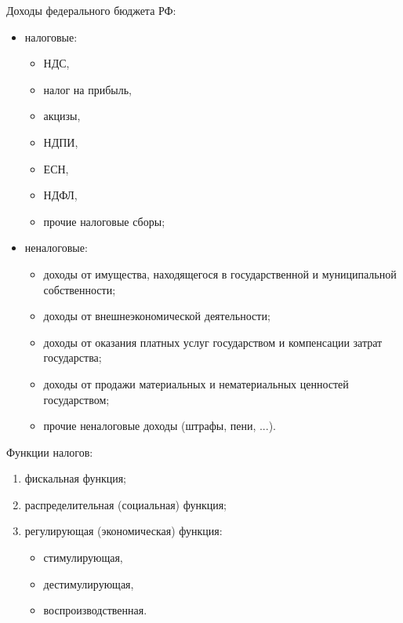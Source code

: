Доходы федерального бюджета РФ:
\begin{itemize}
    \item налоговые:
    \begin{itemize}
        \item НДС,
        \item налог на прибыль,
        \item акцизы,
        \item НДПИ,
        \item ЕСН,
        \item НДФЛ,
        \item прочие налоговые сборы;
    \end{itemize}
    \item неналоговые:
    \begin{itemize}
        \item доходы от имущества, находящегося в государственной и
        муниципальной собственности;
        \item доходы от внешнеэкономической деятельности;
        \item доходы от оказания платных услуг государством и компенсации
        затрат государства;
        \item доходы от продажи материальных и нематериальных ценностей
        государством;
        \item прочие неналоговые доходы (штрафы, пени, ...).
    \end{itemize}
\end{itemize}

Функции налогов:
\begin{enumerate}
    \item фискальная функция;
    \item распределительная (социальная) функция;
    \item регулирующая (экономическая) функция:
    \begin{itemize}
        \item стимулирующая,
        \item дестимулирующая,
        \item воспроизводственная.
    \end{itemize}
\end{enumerate}